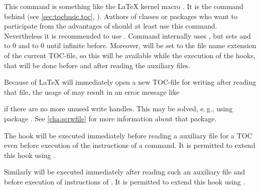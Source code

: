 \begin{Declaration}
\end{Declaration}
This command is something like the \LaTeX{} kernel macro
.  It is the
command behind  (see \autoref{sec:tocbasic.toc},
). Authors of classes or packages
who want to participate from the advantages of  should at
least use this command. Nevertheless it is recommended to use
. Command  internally uses
\Macro{\@starttoc}, but sets
 and  to 0
and  to 0 until infinite before. Moreover,
 will be set to
the file name extension of the current TOC-file, so this will be available
while the execution of the hooks, that will be done before and after reading
the auxiliary files.

Because of \LaTeX{} will immediately open a new TOC-file
for writing after reading that file, the usage of 
may result in an error message like
if there are no more unused write handles. This may be solved, e.\,g., using
package
.
See \autoref{cha:scrwfile} for more information about that package.%
\EndIndexGroup


\begin{Declaration}
\end{Declaration}
The hook  will be executed immediately before
reading a auxiliary file for a TOC even before execution of the instructions
of a  command. It is permitted to extend this hook
using .

Similarly  will be executed immediately after
reading such an auxiliary file and before execution of instructions of
. It is permitted to extend this hook using
.

